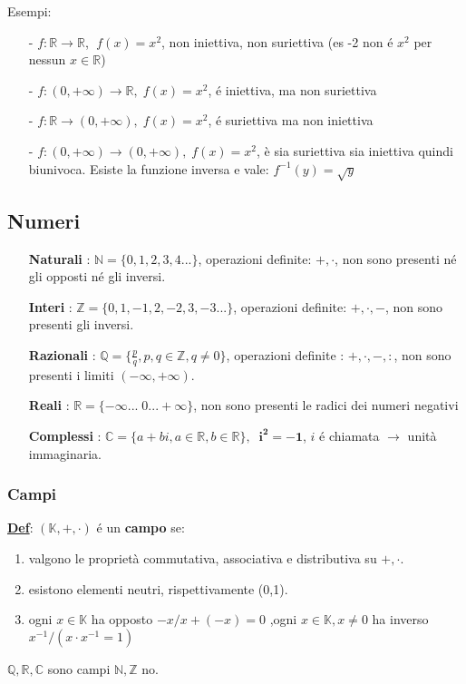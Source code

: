 \documentclass[12pt]{article}
\begin{document}
\noindent Esempi:

\begin{itemize}
    \item[-] $f : \mathbb{R} \longrightarrow \mathbb{R}$, $\;f(x) = x^2$, non iniettiva, non suriettiva (es -2 non é $x^2$ per nessun $x \in \mathbb{R}$) 
    \item[-] $f: (0,+\infty) \longrightarrow \mathbb{R},\; f(x) = x^2$, é iniettiva, ma non suriettiva
    \item[-] $f: \mathbb{R} \longrightarrow (0,+\infty), \; f(x) = x^2$, é suriettiva ma non iniettiva
    \item[-] $f: (0,+\infty) \longrightarrow (0,+\infty), \; f(x) = x^2$, è sia suriettiva sia iniettiva quindi biunivoca. Esiste la funzione inversa e vale: $f^{-1}(y) = \sqrt{y}$
\end{itemize}

\subsection{Numeri}

\begin{itemize}
    \item[] \textbf{Naturali} : $\mathbb{N} = \{0,1,2,3,4...\}$, operazioni definite: $+,\cdot$, non sono presenti né gli opposti né gli inversi.
    \item[] \textbf{Interi} : $\mathbb{Z} = \{0,1,-1,2,-2,3,-3...\}$, operazioni definite: $+,\cdot,-$, non sono presenti gli inversi.
    \item[] \textbf{Razionali} : $\mathbb{Q} = \{\frac{p}{q}, p, q \in \mathbb{Z}, q \neq 0\} $, operazioni definite : $+,\cdot,-,:$, non sono presenti i limiti $(-\infty, +\infty)$.
    \item[] \textbf{Reali} : $\mathbb{R} = \{-\infty...\;0...+\infty\}$, non sono presenti le radici dei numeri negativi
    \item[] \textbf{Complessi} : $\mathbb{C} = \{a + bi, a\in{\mathbb{R}}, b\in{\mathbb{R}}\}, \;\; \boldsymbol{i^2 = -1}$, $i$ é chiamata $\rightarrow$ unità immaginaria.
\end{itemize}

\noindent\subsubsection{Campi}
\textbf{\underline{Def}}: $(\mathbb{K}, +, \cdot)$ é un \textbf{campo} se:

\begin{enumerate}
    \item valgono le proprietà commutativa, associativa e distributiva su $+, \cdot$.
    \item esistono elementi neutri, rispettivamente (0,1).
    \item ogni $x \in \mathbb{K}$ ha opposto $-x / x+(-x) = 0  $ ,ogni  $x\in \mathbb{K}, x \neq 0 $ ha inverso $x^{-1} / (x \cdot x^{-1} = 1)$
\end{enumerate}
$\mathbb{Q,R,C}$ sono campi $\mathbb{N,Z}$ no.
\end{document}
